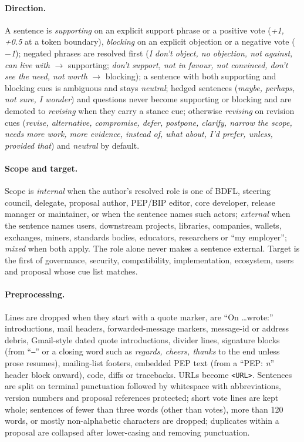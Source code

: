 \paragraph{Direction.} A sentence is \emph{supporting} on an explicit support phrase or a positive vote (\emph{+1, +0.5} at a token boundary), \emph{blocking} on an explicit objection or a negative vote (\emph{$-$1}); negated phrases are resolved first (\emph{I don't object, no objection, not against, can live with} $\rightarrow$ supporting; \emph{don't support, not in favour, not convinced, don't see the need, not worth} $\rightarrow$ blocking); a sentence with both supporting and blocking cues is ambiguous and stays \emph{neutral}; hedged sentences (\emph{maybe, perhaps, not sure, I wonder}) and questions never become supporting or blocking and are demoted to \emph{revising} when they carry a stance cue; otherwise \emph{revising} on revision cues (\emph{revise, alternative, compromise, defer, postpone, clarify, narrow the scope, needs more work, more evidence, instead of, what about, I'd prefer, unless, provided that}) and \emph{neutral} by default.

\paragraph{Scope and target.} Scope is \emph{internal} when the author's resolved role is one of BDFL, steering council, delegate, proposal author, PEP/BIP editor, core developer, release manager or maintainer, or when the sentence names such actors; \emph{external} when the sentence names users, downstream projects, libraries, companies, wallets, exchanges, miners, standards bodies, educators, researchers or ``my employer''; \emph{mixed} when both apply. The role alone never makes a sentence external. Target is the first of governance, security, compatibility, implementation, ecosystem, users and proposal whose cue list matches.

\paragraph{Preprocessing.} Lines are dropped when they start with a quote marker, are ``On \ldots wrote:'' introductions, mail headers, forwarded-message markers, message-id or address debris, Gmail-style dated quote introductions, divider lines, signature blocks (from ``\texttt{--}'' or a closing word such as \emph{regards, cheers, thanks} to the end unless prose resumes), mailing-list footers, embedded PEP text (from a ``PEP: \emph{n}'' header block onward), code, diffs or tracebacks. URLs become \texttt{<URL>}. Sentences are split on terminal punctuation followed by whitespace with abbreviations, version numbers and proposal references protected; short vote lines are kept whole; sentences of fewer than three words (other than votes), more than 120 words, or mostly non-alphabetic characters are dropped; duplicates within a proposal are collapsed after lower-casing and removing punctuation.
